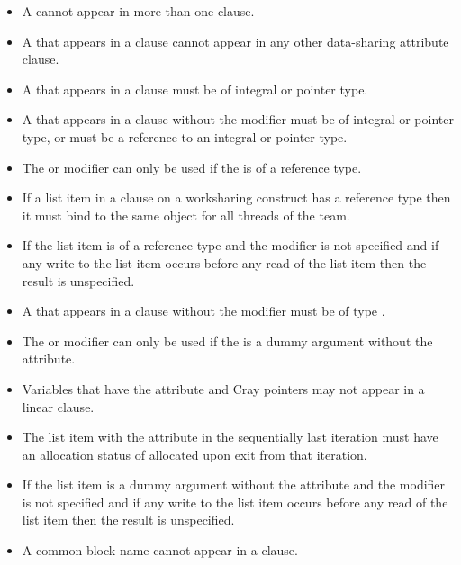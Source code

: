 {{{{\begin{itemize}
\item A  cannot appear in more than one  clause.

\item A  that appears in a  clause cannot appear in any other data-sharing 
attribute clause. 

\cspecificstart
\item A  that appears in a  clause must be of integral or pointer type.
\cspecificend

\cppspecificstart
\item A  that appears in a  clause without the  modifier must be of integral or pointer type, or must be a reference to an integral or pointer type. 
\item The  or  modifier can only be used if the  is of a reference type.
\item If a list item in a  clause on a worksharing
construct has a reference type then it must bind to the same object for all threads of the team.
\item If the list item is of a reference type and the  modifier is not specified and if any write to the list item occurs before any read of the list item then the result is unspecified.
\cppspecificend

\fortranspecificstart
\item A  that appears in a  clause without the  modifier must be of type .
\item The  or  modifier can only be used if the  is a dummy argument without the  attribute.
\item Variables that have the  attribute and Cray pointers may not appear in a linear clause. 
\item The list item with the  attribute in the sequentially last iteration must have an allocation status of allocated upon exit from that iteration. 
\item If the list item is a dummy argument without the  attribute and the  modifier is not specified and if any write to the list item occurs before any read of the list item then the result is unspecified.
\item A common block name cannot appear in a  clause.
\fortranspecificend
\end{itemize}










}}}}
